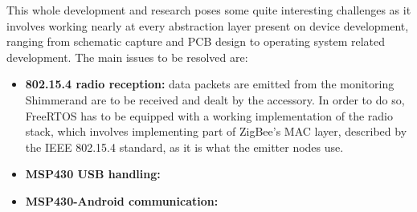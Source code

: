 	This whole development and research poses some quite interesting challenges as it involves working nearly at every abstraction layer present on device development, ranging from schematic capture and PCB design to operating system related development. The main issues to be resolved are:
	\begin{itemize}
		\item \textbf{802.15.4 radio reception:}
			data packets are emitted from the monitoring Shimmer\texttrademark and are to be received and dealt
			by the accessory. In order to do so, FreeRTOS has to be equipped with a working implementation of
			the radio stack, which involves implementing part of ZigBee's MAC layer, described by the IEEE 802.15.4
			standard, as it is what the emitter nodes use. 
		\item \textbf{MSP430 USB handling:}
			\begin{comment}
			The interaction between MSP430 and android was the most dangerous risk of this develop because there aren't information of any kind because it's not researched. USB is quite not as simple as everybody believes, there are many different protocols that works with USB, and each protocol can be implemented in very different ways, this implies a huge investigation process to find if any of them can be used by us. The final way to communicate both devices will be extendedly explained en section 3.4.2.\\
			\end{comment}	
		\item \textbf{MSP430-Android communication:}
	\end{itemize}
	
